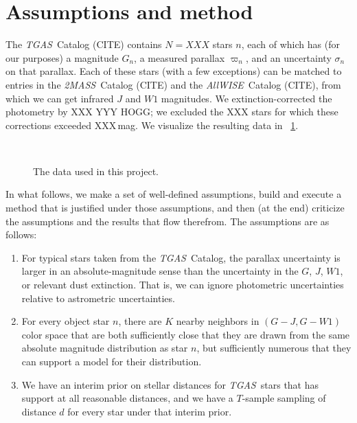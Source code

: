 \documentclass[12pt]{article}
\newcommand{\project}[1]{\textsl{#1}}
\newcommand{\acronym}[1]{\small{#1}}
\newcommand{\tgas}{\project{\acronym{TGAS}}}
\newcommand{\twomass}{\project{\acronym{2MASS}}}
\newcommand{\wise}{\project{All\acronym{WISE}}}
\newcommand{\wone}{W\!\mathit{1}}
\begin{document}
\section{Assumptions and method}

The \tgas\ Catalog (CITE) contains $N=XXX$ stars $n$, each of which has (for
our purposes) a magnitude $G_n$, a measured parallax $\varpi_n$, and
an uncertainty $\sigma_n$ on that parallax.
Each of these stars (with a few exceptions) can be matched to entries
in the \twomass\ Catalog (CITE) and the \wise\ Catalog (CITE), from
which we can get infrared $J$ and $\wone$ magnitudes.
We extinction-corrected the photometry by XXX YYY HOGG; we excluded
the XXX stars for which these corrections exceeded XXX\,mag.
We visualize the resulting data in \figurename~\ref{fig:data}.
%
\begin{figure}[p]
~~
\caption{The data used in this project.\label{fig:data}}
\end{figure}

In what follows, we make a set of well-defined assumptions, build and
execute a method that is justified under those assumptions, and then
(at the end) criticize the assumptions and the results that flow therefrom.
The assumptions are as follows:
\begin{enumerate}\itemsep=0ex
\item For typical stars taken from the \tgas\ Catalog, the parallax
  uncertainty is larger in an absolute-magnitude sense than the
  uncertainty in the $G$, $J$, $\wone$, or relevant dust extinction. That
  is, we can ignore photometric uncertainties relative to astrometric
  uncertainties.
\item For every object star $n$, there are $K$ nearby neighbors in
  $(G-J, G-\wone)$ color space that are both sufficiently close that they
  are drawn from the same absolute magnitude distribution as star $n$,
  but sufficiently numerous that they can support a model for their
  distribution.
\item We have an interim prior on stellar distances for \tgas\ stars
  that has support at all reasonable distances, and we have a
  $T$-sample sampling of distance $d$ for every star under that
  interim prior.
\end{enumerate}
\end{document}
